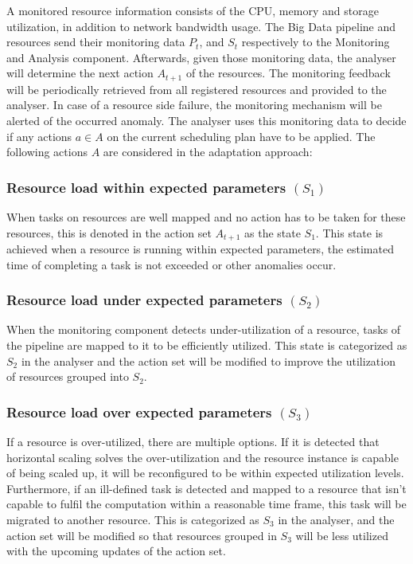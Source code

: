       A monitored resource information consists of the CPU, memory and storage utilization, in addition to network bandwidth usage.
      The Big Data pipeline and resources send their monitoring data $P_t$, and $S_t$ respectively to the Monitoring and Analysis component.
      Afterwards, given those monitoring data, the analyser will determine the next action $A_{t+1}$ of the resources.
      The monitoring feedback will be periodically retrieved from all registered resources and provided to the analyser.
      In case of a resource side failure, the monitoring mechanism will be alerted of the occurred anomaly.  
      The analyser uses this monitoring data to decide if any actions $a \in A$ on the current scheduling plan have to be applied.
      The following actions $A$ are considered in the adaptation approach:

      \subsubsection*{Resource load within expected parameters $(S_1)$} 

        When tasks on resources are well mapped and no action has to be taken for these resources, this is denoted in the action set $A_{t+1}$ as the state $S_1$. This state is achieved when a resource is running within expected parameters, the estimated time of completing a task is not exceeded or other anomalies occur.

      \subsubsection*{Resource load under expected parameters $(S_2)$}

        When the monitoring component detects under-utilization of a resource, tasks of the pipeline are mapped to it to be efficiently utilized. This state is categorized as $S_2$ in the analyser and the action set will be modified to improve the utilization of resources grouped into $S_2$. 

      \subsubsection*{Resource load over expected parameters $(S_3)$} 

        If a resource is over-utilized, there are multiple options. If it is detected that horizontal scaling solves the over-utilization and the resource instance is capable of being scaled up, it will be reconfigured to be within expected utilization levels. Furthermore, if an ill-defined task is detected and mapped to a resource that isn't capable to fulfil the computation within a reasonable time frame, this task will be migrated to another resource. 
        This is categorized as $S_3$ in the analyser, and the action set will be modified so that resources grouped in $S_3$ will be less utilized with the upcoming updates of the action set. \cite{kimovskiBigDataPipeline2022}




